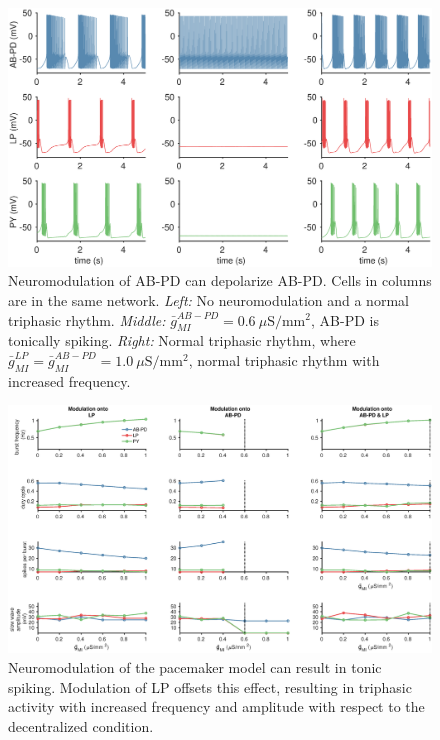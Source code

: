 \FloatBarrier

\begin{figure}[t]
	\centering
	\includegraphics[width=1.0\linewidth]{gfx/all-modulation/traces4}
	\caption[Modulation of AB-PD can elicit tonic spiking (traces)]{Neuromodulation of \acs{AB}-\acs{PD} can depolarize \acs{AB}-\acs{PD}. Cells in columns are in the same network. \textit{Left:} No neuromodulation and a normal triphasic rhythm. \textit{Middle:} $\bar{g}_{MI}^{AB-PD} = 0.6~\mu \mathrm{S/mm^2}$, \acs{AB}-\acs{PD} is tonically spiking. \textit{Right:} Normal triphasic rhythm, where $\bar{g}_{MI}^{LP} = \bar{g}_{MI}^{AB-PD} = 1.0~\mu \mathrm{S/mm^2}$, normal triphasic rhythm with increased frequency.}
	\label{fig:traces4}
\end{figure}

\begin{figure}[b]
	\centering
	\includegraphics[width=1.0\linewidth]{gfx/all-modulation/metrics4}
	\caption[Modulation of AB-PD can elecit tonic spiking (metrics)]{Neuromodulation of the pacemaker model can result in tonic spiking. Modulation of LP offsets this effect, resulting in triphasic activity with increased frequency and amplitude with respect to the decentralized condition.}
	\label{fig:metrics4}
\end{figure}


